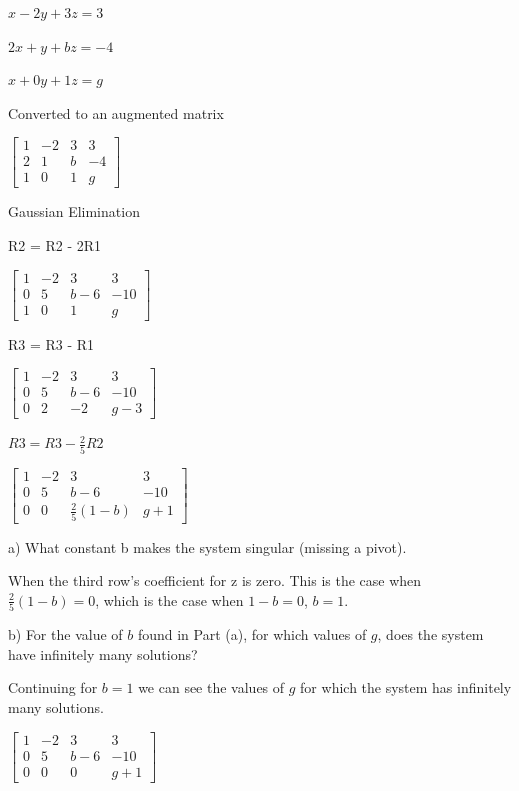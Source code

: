 \documentclass{article}
\begin{document}
$x - 2y + 3z = 3$

$2x + y + bz = -4$

$x + 0y + 1z = g$

Converted to an augmented matrix

$\left[
\begin{array}{ccc|c}
  1 & -2 & 3 & 3 \\
  2 & 1 & b& -4\\
  1 & 0 & 1 & g
\end{array}
\right]$

Gaussian Elimination

R2 = R2 - 2R1

$\left[
\begin{array}{ccc|c}
  1 & -2 & 3 & 3 \\
  0 & 5 & b-6 & -10\\
  1 & 0 & 1 & g
\end{array}
\right]$

R3 = R3 - R1

$\left[
\begin{array}{ccc|c}
  1 & -2 & 3 & 3 \\
  0 & 5 & b-6 & -10\\
  0 & 2 & -2 & g - 3
\end{array}
\right]$

$R3 = R3 - \frac{2}{5}R2$

$\left[
\begin{array}{ccc|c}
  1 & -2 & 3 & 3 \\
  0 & 5 & b-6 & -10\\
  0 & 0 & \frac{2}{5} (1 - b) & g + 1
\end{array}
\right]$

a) What constant b makes the system singular (missing a pivot).

When the third row's coefficient for z is zero.  This is the case when $\frac{2}{5}(1-b) = 0$, which is the case when $1-b = 0$, $b=1$.

b) For the value of $b$ found in Part (a), for which values of $g$, does the system have infinitely many solutions?

Continuing for $b=1$ we can see the values of $g$ for which the system has infinitely many solutions.

$\left[
\begin{array}{ccc|c}
  1 & -2 & 3 & 3 \\
  0 & 5 & b-6 & -10\\
  0 & 0 & 0 & g + 1
\end{array}
\right]$
\end{document}
